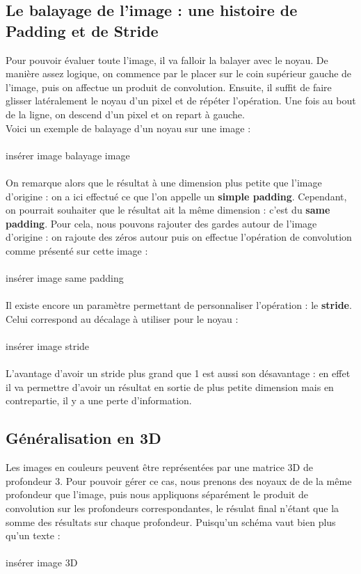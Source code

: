 \documentclass{article}
\begin{document}
\subsection{Le balayage de l'image : une histoire de Padding et de Stride}

Pour pouvoir évaluer toute l'image, il va falloir la balayer avec le noyau. De manière assez logique, on commence par le placer sur le coin supérieur gauche de l'image, puis on affectue un produit de convolution. Ensuite, il suffit de faire glisser latéralement le noyau d'un pixel et de répéter l'opération. Une fois au bout de la ligne, on descend d'un pixel et on repart à gauche. \\
Voici un exemple de balayage d'un noyau sur une image : \\
\\
{insérer image balayage image}\\
\\
On remarque alors que le résultat à une dimension plus petite que l'image d'origine : on a ici effectué ce que l'on appelle un \textbf{simple padding}. Cependant, on pourrait souhaiter que le résultat ait la même dimension : c'est du \textbf{same padding}. Pour cela, nous pouvons rajouter des gardes autour de l'image d'origine : on rajoute des zéros autour puis on effectue l'opération de convolution comme présenté sur cette image :\\
\\
{insérer image same padding}\\
\\
Il existe encore un paramètre permettant de personnaliser l'opération : le \textbf{stride}. Celui correspond au décalage à utiliser pour le noyau :\\
\\
{insérer image stride}\\
\\ 
L'avantage d'avoir un stride plus grand que 1 est aussi son désavantage : en effet il va permettre d'avoir un résultat en sortie de plus petite dimension mais en contrepartie, il y a une perte d'information.

\subsection{Généralisation en 3D}

Les images en couleurs peuvent être représentées par une matrice 3D de profondeur 3. Pour pouvoir gérer ce cas, nous prenons des noyaux de de la même profondeur que l'image, puis nous appliquons séparément le produit de convolution sur les profondeurs correspondantes, le résulat final n'étant que la somme des résultats sur chaque profondeur. Puisqu'un schéma vaut bien plus qu'un texte :\\
\\
{insérer image 3D}\\
\\
\end{document}
